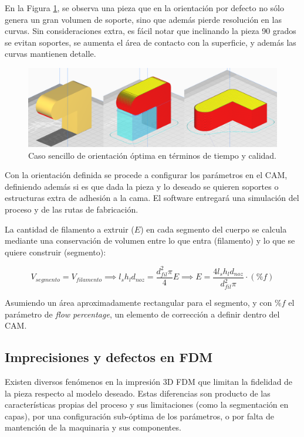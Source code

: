En la Figura \ref{orientfig}, se observa una pieza que en la orientación por defecto no sólo genera un gran volumen de soporte, sino que además pierde resolución en las curvas. Sin consideraciones extra, es fácil notar que inclinando la pieza 90 grados se evitan soportes, se aumenta el área de contacto con la superficie, y además las curvas mantienen detalle.

\begin{figure}[h!]
	\centering
	\includegraphics[width=0.9\linewidth]{imgs/orient.png}
	\caption{Caso sencillo de orientación óptima en términos de tiempo y calidad.}
	\label{orientfig}
\end{figure}


Con la orientación definida se procede a configurar los parámetros en el CAM, definiendo además si es que dada la pieza y lo deseado se quieren soportes o estructuras extra de adhesión a la cama. El software entregará una simulación del proceso y de las rutas de fabricación. 

La cantidad de filamento a extruir ($E$) en cada segmento del cuerpo se calcula mediante una conservación de volumen entre lo que entra (filamento) y lo que se quiere construir (segmento):

\begin{equation}
	V_{segmento}=V_{filamento}\implies l_{s}h_{l}d_{noz}=\frac{d_{fil}^{2}\pi}{4}E\implies E= \frac{4 l_{s}h_{l}d_{noz}}{d_{fil}^{2} \pi} \cdot (\%f)
\end{equation}

Asumiendo un área aproximadamente rectangular para el segmento, y con $\%f$ el parámetro de \textit{flow percentage}, un elemento de corrección a definir dentro del CAM.

\subsection{Imprecisiones y defectos en FDM}

Existen diversos fenómenos en la impresión 3D FDM que limitan la fidelidad de la pieza respecto al modelo deseado. Estas diferencias son producto de las características propias del proceso y sus limitaciones (como la segmentación en capas), por una configuración sub-óptima de los parámetros, o por falta de mantención de la maquinaria y sus componentes.

